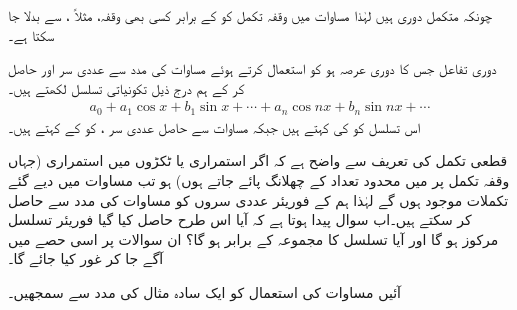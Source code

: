 چونکہ متکمل دوری ہیں لہٰذا مساوات  میں وقفہ تکمل کو  کے برابر کسی بھی وقفہ، مثلاً ،  سے بدلا جا سکتا ہے۔

دوری تفاعل  جس کا دوری عرصہ  ہو کو استعمال کرتے ہوئے مساوات  کی مدد سے عددی سر  اور  حاصل کر کے ہم درج ذیل تکونیاتی تسلسل لکھتے ہیں۔
\begin{align}\label{مساوات_فوریئر_تسلسل_تفاعل_کی}
a_0+a_1\cos x+b_1\sin x+\cdots+a_n\cos nx+b_n\sin nx+\cdots
\end{align}
اس تسلسل کو  کی  کہتے ہیں جبکہ مساوات  سے حاصل عددی سر ،  کو  کے  کہتے ہیں۔

قطعی تکمل کی تعریف سے واضح ہے کہ اگر  استمراری یا ٹکڑوں میں استمراری (جہاں وقفہ تکمل پر  میں محدود تعداد کے چھلانگ پائے جاتے ہوں) ہو تب مساوات  میں دیے گئے تکملات موجود ہوں گے لہٰذا ہم  کے فوریئر عددی سروں کو مساوات  کی مدد سے حاصل کر سکتے ہیں۔اب سوال پیدا ہوتا ہے کہ آیا اس طرح حاصل کیا گیا فوریئر تسلسل مرکوز ہو گا اور آیا تسلسل کا مجموعہ  کے برابر ہو گا؟  ان سوالات پر اسی حصے میں آگے جا کر غور کیا جائے گا۔

آئیں مساوات  کی استعمال کو ایک سادہ مثال کی مدد سے سمجھیں۔

